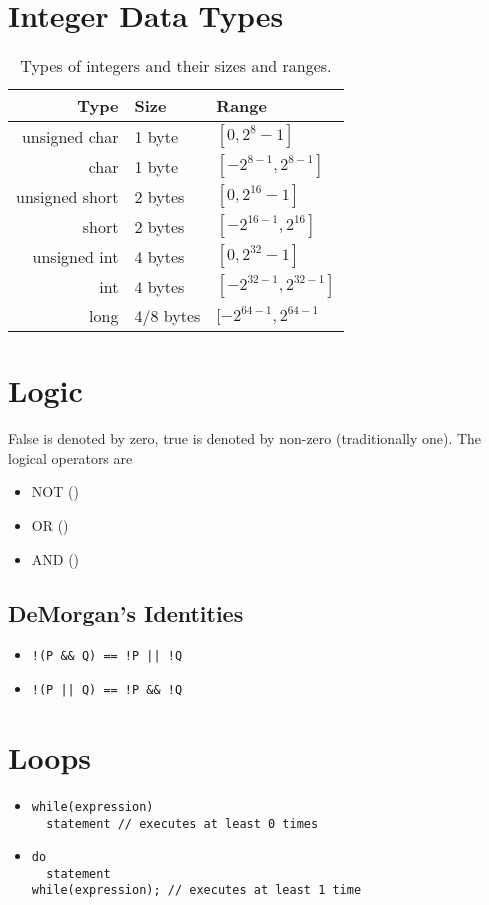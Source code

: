 \documentclass[12pt]{article}
\begin{document}
\section*{Integer Data Types}
\begin{table}[ht]
\centering
  \caption{Types of integers and their sizes and ranges.}
  \begin{tabular}{r|ll}
  Type & Size & Range \\ \hline 
  unsigned char & 1 byte & $[0,2^8-1]$ \\ 
  char   & 1 byte & $[-2^{8-1},2^{8-1}]$ \\ 
  unsigned short & 2 bytes & $[0,2^{16}-1]$ \\ 
  short & 2 bytes & $[-2^{16-1},2^{16}]$ \\ 
  unsigned int & 4 bytes & $[0,2^{32}-1]$ \\ 
  int & 4 bytes & $[-2^{32-1},2^{32-1}]$ \\ 
  long & 4/8 bytes & $[-2^{64-1},2^{64-1}$ \\ \hline
  \end{tabular}
\end{table}

\section*{Logic}
False is denoted by zero, true is denoted by non-zero (traditionally one). The logical operators are
\begin{itemize}
\item NOT (\code{!})
\item OR (\code{||})
\item AND (\code{\&\&})
\end{itemize}

\subsection*{DeMorgan's Identities}
\begin{itemize}
\item \begin{verbatim}!(P && Q) == !P || !Q\end{verbatim}
\item \begin{verbatim}!(P || Q) == !P && !Q\end{verbatim}
\end{itemize}

\section*{Loops}
\begin{itemize}
\item \begin{verbatim}while(expression)
  statement // executes at least 0 times\end{verbatim}
\item \begin{verbatim}do
  statement
while(expression); // executes at least 1 time\end{verbatim}
\end{itemize}
\end{document}
